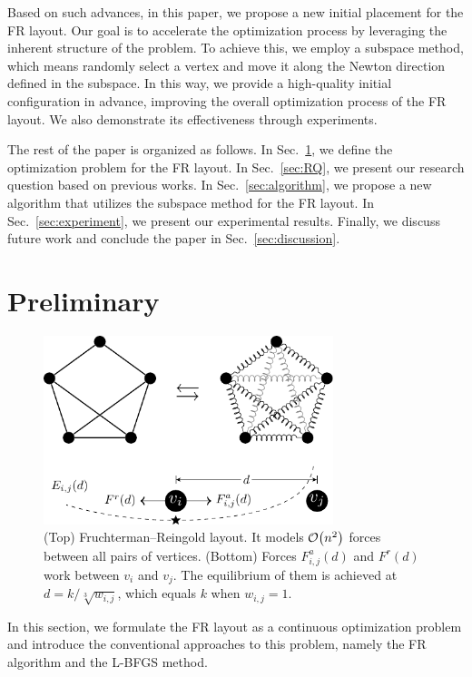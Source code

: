\documentclass[dvipdfmx,journal]{IEEEtran}
\begin{document}
Based on such advances, in this paper, we propose a new initial placement for the FR layout.
Our goal is to accelerate the optimization process by leveraging the inherent structure of the problem.
To achieve this, we employ a subspace method, which means randomly select a vertex and move it along the Newton direction defined in the subspace.
In this way, we provide a high-quality initial configuration in advance, improving the overall optimization process of the FR layout.
We also demonstrate its effectiveness through experiments.

The rest of the paper is organized as follows.
In Sec.~\ref{sec:preliminary}, we define the optimization problem for the FR layout.
In Sec.~\ref{sec:RQ}, we present our research question based on previous works.
In Sec.~\ref{sec:algorithm}, we propose a new algorithm that utilizes the subspace method for the FR layout.
In Sec.~\ref{sec:experiment}, we present our experimental results.
Finally, we discuss future work and conclude the paper in Sec.~\ref{sec:discussion}.

\section{Preliminary}\label{sec:preliminary}

\begin{figure}[t]
  \centering
  \includegraphics[height=5.5cm]{fr_layout/fr_layout.pdf}
  \caption{
    (Top) Fruchterman--Reingold layout. It models $\order{n^2}$ forces between all pairs of vertices.
    (Bottom) Forces $F_{i,j}^a(d)$ and $F^r(d)$ work between $v_i$ and $v_j$. The equilibrium of them is achieved at $d = k/\sqrt[3]{w_{i,j}}$, which equals $k$ when $w_{i,j} = 1$.
  }
  \label{fig:frLayout}
\end{figure}

In this section, we formulate the FR layout as a continuous optimization problem and introduce the conventional approaches to this problem, namely the FR algorithm and the L-BFGS method.
\end{document}
